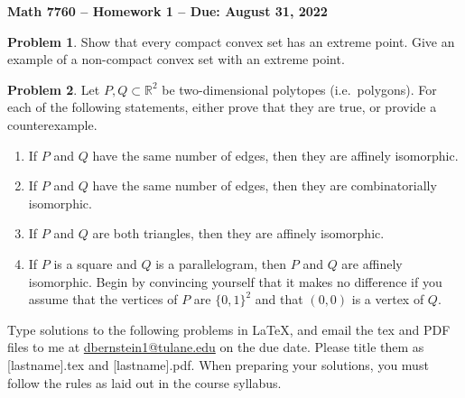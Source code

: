 \documentclass[letterpaper,11pt]{amsart}
\theoremstyle{plain}
\theoremstyle{definition}
\newtheorem{pr}{Problem}
\theoremstyle{remark}
\begin{document}
\Large

\begin{center}
{\bf Math 7760 -- Homework  1 --  Due:  August 31, 2022}
\end{center}

\normalsize


\medskip


\begin{pr}
    Show that every compact convex set has an extreme point. Give an example of a non-compact convex set with an extreme point.
\end{pr}

\begin{pr}
    Let $P,Q \subset \mathbb{R}^2$ be two-dimensional polytopes (i.e.~polygons).
    For each of the following statements, either prove that they are true, or provide a counterexample.
    \begin{enumerate}
        \item If $P$ and $Q$ have the same number of edges, then they are affinely isomorphic.
        \item If $P$ and $Q$ have the same number of edges, then they are combinatorially isomorphic.
        \item If $P$ and $Q$ are both triangles, then they are affinely isomorphic.
        \item If $P$ is a square and $Q$ is a parallelogram, then $P$ and $Q$ are affinely isomorphic.
        Begin by convincing yourself that it makes no difference if you assume that the vertices of $P$ are $\{0,1\}^2$ and that
        $(0,0)$ is a vertex of $Q$.
    \end{enumerate}
\end{pr}



\bigskip

Type solutions to the following problems in \LaTeX, and email the tex and PDF files to me at \url{dbernstein1@tulane.edu} on the due date.
Please title them as [lastname].tex and [lastname].pdf.
When preparing your solutions, you must follow the rules as laid out in the course syllabus.

\vspace{.5cm}

\end{document}

